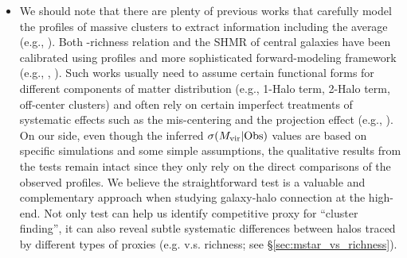 \documentclass[fleqn,usenatbib,useAMS,english]{mnras}
\begin{document}
\begin{itemize}
        \item We should note that there are plenty of previous works that carefully model the 
            \dsigma{} profiles of massive clusters to extract information including the average
            \mvir{} (e.g., \addref{}).
            Both \mvir{}-richness relation and the SHMR of central galaxies have been 
            calibrated using \dsigma{} profiles and more sophisticated forward-modeling framework
            (e.g., \citealt{Murata2018, Murata2019}, \addref{}).
            Such works usually need to assume certain functional forms for different components 
            of matter distribution (e.g., 1-Halo term, 2-Halo term, off-center clusters) and 
            often rely on certain imperfect treatments of systematic effects such as the 
            mis-centering and the projection effect (e.g., \addref{}). 
            On our side, even though the inferred $\sigma(M_{\rm vir} | {\rm Obs})$ values are
            based on specific simulations and some simple assumptions, the
            qualitative results from the \topn{} tests remain intact since they only rely on
            the direct comparisons of the observed \dsigma{} profiles.
            We believe the straightforward \topn{} test is a valuable and complementary 
            approach when studying galaxy-halo connection at the high-\mvir{} end.
            Not only \topn{} test can help us identify competitive \mvir{} proxy for 
            ``cluster finding'', it can also reveal subtle systematic differences between 
            halos traced by different types of proxies (e.g. \mstar{} v.s. richness; see
            \S \ref{sec:mstar_vs_richness}).

    \end{itemize}
\end{document}
